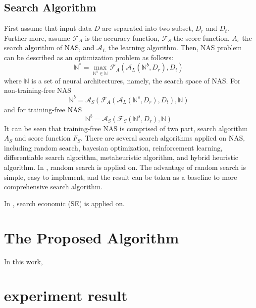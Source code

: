 \documentclass[sigconf]{acmart}
\begin{document}
    \subsection{Search Algorithm}
    First assume that input data $D$ are separated into two subset, $D_r$ and $D_t$. Further more, 
    assume $\mathcal F_A$ is the accuracy function, $\mathcal F_S$ the score function, $A_s$ the 
    search algorithm of NAS, and $\mathcal A_L$ the learning algorithm. Then, NAS problem can be 
    described as an optimization problem as follows: 
    \begin{equation}
        \label{equ:nas}
        \mathbb N^*=\max_{\mathbb N^b\in\mathbb N}\mathcal F_A(\mathcal A_L(\mathbb N^b, D_r), D_t)
    \end{equation}
    where $\mathbb N$ is a set of neural architectures, namely, the search space of NAS. 
    For non-training-free NAS 
    \begin{equation}
        \label{equ:non-training_free_nas}
        \mathbb N^b=\mathcal A_S(\mathcal F_A(\mathcal A_L(\mathbb N^s, D_r), D_t), \mathbb N)
    \end{equation}
    and for training-free NAS 
    \begin{equation}
        \label{equ:training_free_nas}
        \mathbb N^b=\mathcal A_S(\mathcal F_S(\mathbb N^s, D_r), \mathbb N)
    \end{equation}
    It can be seen that training-free NAS is comprised of two part, search algorithm $A_S$ and score 
    function $F_S$. 
    There are several search algorithms applied on NAS, including random search, bayesian optimization, 
    reinforcement learning, differentiable search algorithm, metaheuristic algorithm, and hybrid 
    heuristic algorithm. 
    In \cite{https://doi.org/10.48550/arxiv.2006.04647} \cite{Lopes_2021}, random search is applied on. 
    The advantage of random search is simple, easy to implement, and the result can be token as a 
    baseline to more comprehensive search algorithm. 

    In \cite{10092788}, search economic (SE) \cite{7379579} is applied on. 
    
    \section{The Proposed Algorithm}
    \label{sec:proposed}
    In this work, 


    \section{experiment result}
    \label{sec:results} 
\end{document}
